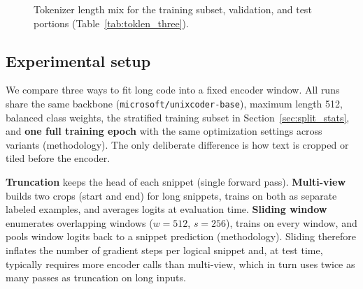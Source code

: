 \documentclass[10pt]{article}
\begin{document}
\begin{figure}[htbp]
  \centering
  \caption{Tokenizer length mix for the training subset, validation, and test portions (Table~\ref{tab:toklen_three}).}
  \label{fig:toklen_three}
\end{figure}

\subsection{Experimental setup}
\label{sec:exp_setup}
We compare three ways to fit long code into a fixed encoder window. All runs share the same backbone (\texttt{microsoft/unixcoder-base}), maximum length 512, balanced class weights, the stratified training subset in Section~\ref{sec:split_stats}, and \textbf{one full training epoch} with the same optimization settings across variants (methodology). The only deliberate difference is how text is cropped or tiled before the encoder.

\textbf{Truncation} keeps the head of each snippet (single forward pass). \textbf{Multi-view} builds two crops (start and end) for long snippets, trains on both as separate labeled examples, and averages logits at evaluation time. \textbf{Sliding window} enumerates overlapping windows ($w{=}512$, $s{=}256$), trains on every window, and pools window logits back to a snippet prediction (methodology). Sliding therefore inflates the number of gradient steps per logical snippet and, at test time, typically requires more encoder calls than multi-view, which in turn uses twice as many passes as truncation on long inputs.
\end{document}
